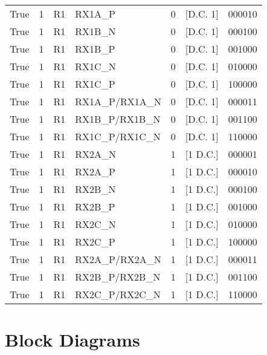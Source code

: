 \documentclass{article}
\begin{document}
\begin{landscape}
\begin{scriptsize}
\begin{longtable}{|p{4.5cm}|p{3.5cm}|p{1.5cm}|p{3.5cm}|p{1.75cm}|p{2.1cm}|p{2cm}|}
		True & 1 & R1 & RX1A\_P         & 0 & [D.C. 1]  & 000010 \\
		True & 1 & R1 & RX1B\_N         & 0 & [D.C. 1]  & 000100 \\
		True & 1 & R1 & RX1B\_P         & 0 & [D.C. 1]  & 001000 \\
		True & 1 & R1 & RX1C\_N         & 0 & [D.C. 1]  & 010000 \\
		True & 1 & R1 & RX1C\_P         & 0 & [D.C. 1]  & 100000 \\
		True & 1 & R1 & RX1A\_P/RX1A\_N & 0 & [D.C. 1]  & 000011 \\
		True & 1 & R1 & RX1B\_P/RX1B\_N & 0 & [D.C. 1]  & 001100 \\
		True & 1 & R1 & RX1C\_P/RX1C\_N & 0 & [D.C. 1]  & 110000 \\
		\hline
		True & 1 & R1 & RX2A\_N         & 1 & [1 D.C.] & 000001 \\
		True & 1 & R1 & RX2A\_P         & 1 & [1 D.C.] & 000010 \\
		True & 1 & R1 & RX2B\_N         & 1 & [1 D.C.] & 000100 \\
		True & 1 & R1 & RX2B\_P         & 1 & [1 D.C.] & 001000 \\
		True & 1 & R1 & RX2C\_N         & 1 & [1 D.C.] & 010000 \\
		True & 1 & R1 & RX2C\_P         & 1 & [1 D.C.] & 100000 \\
		True & 1 & R1 & RX2A\_P/RX2A\_N & 1 & [1 D.C.] & 000011 \\
		True & 1 & R1 & RX2B\_P/RX2B\_N & 1 & [1 D.C.] & 001100 \\
		True & 1 & R1 & RX2C\_P/RX2C\_N & 1 & [1 D.C.] & 110000 \\
		\hline
	\end{longtable}
	
\end{scriptsize}
\end{landscape}

\section*{Block Diagrams}
\end{document}
